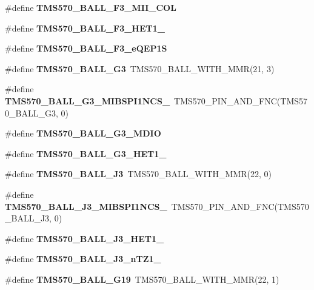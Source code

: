 \begin{DoxyCompactItemize}
\#define {\bfseries T\+M\+S570\+\_\+\+B\+A\+L\+L\+\_\+\+F3\+\_\+\+M\+I\+I\+\_\+\+C\+OL}
\item 
\#define {\bfseries T\+M\+S570\+\_\+\+B\+A\+L\+L\+\_\+\+F3\+\_\+\+H\+E\+T1\+\_}
\item 
\#define {\bfseries T\+M\+S570\+\_\+\+B\+A\+L\+L\+\_\+\+F3\+\_\+e\+Q\+E\+P1S}
\item 
\mbox{\label{tms570lc4357-pins_8h_a65a94c12e8d92a052183ad73616a081c}} 
\#define {\bfseries T\+M\+S570\+\_\+\+B\+A\+L\+L\+\_\+\+G3}~T\+M\+S570\+\_\+\+B\+A\+L\+L\+\_\+\+W\+I\+T\+H\+\_\+\+M\+MR(21, 3)
\item 
\mbox{\label{tms570lc4357-pins_8h_ad175b01b70b065802d07c34ea0d43230}} 
\#define {\bfseries T\+M\+S570\+\_\+\+B\+A\+L\+L\+\_\+\+G3\+\_\+\+M\+I\+B\+S\+P\+I1\+N\+C\+S\+\_}~T\+M\+S570\+\_\+\+P\+I\+N\+\_\+\+A\+N\+D\+\_\+\+F\+NC(T\+M\+S570\+\_\+\+B\+A\+L\+L\+\_\+\+G3, 0)
\item 
\#define {\bfseries T\+M\+S570\+\_\+\+B\+A\+L\+L\+\_\+\+G3\+\_\+\+M\+D\+IO}
\item 
\#define {\bfseries T\+M\+S570\+\_\+\+B\+A\+L\+L\+\_\+\+G3\+\_\+\+H\+E\+T1\+\_}
\item 
\mbox{\label{tms570lc4357-pins_8h_a1795b598acd2954e07181a8b30e144aa}} 
\#define {\bfseries T\+M\+S570\+\_\+\+B\+A\+L\+L\+\_\+\+J3}~T\+M\+S570\+\_\+\+B\+A\+L\+L\+\_\+\+W\+I\+T\+H\+\_\+\+M\+MR(22, 0)
\item 
\mbox{\label{tms570lc4357-pins_8h_ab1ba90a63d17835f35b5a9de591ec862}} 
\#define {\bfseries T\+M\+S570\+\_\+\+B\+A\+L\+L\+\_\+\+J3\+\_\+\+M\+I\+B\+S\+P\+I1\+N\+C\+S\+\_}~T\+M\+S570\+\_\+\+P\+I\+N\+\_\+\+A\+N\+D\+\_\+\+F\+NC(T\+M\+S570\+\_\+\+B\+A\+L\+L\+\_\+\+J3, 0)
\item 
\#define {\bfseries T\+M\+S570\+\_\+\+B\+A\+L\+L\+\_\+\+J3\+\_\+\+H\+E\+T1\+\_}
\item 
\#define {\bfseries T\+M\+S570\+\_\+\+B\+A\+L\+L\+\_\+\+J3\+\_\+n\+T\+Z1\+\_}
\item 
\mbox{\label{tms570lc4357-pins_8h_a8efe435b2e99c7ac6be20d020f04745c}} 
\#define {\bfseries T\+M\+S570\+\_\+\+B\+A\+L\+L\+\_\+\+G19}~T\+M\+S570\+\_\+\+B\+A\+L\+L\+\_\+\+W\+I\+T\+H\+\_\+\+M\+MR(22, 1)
\item 

\end{DoxyCompactItemize}
